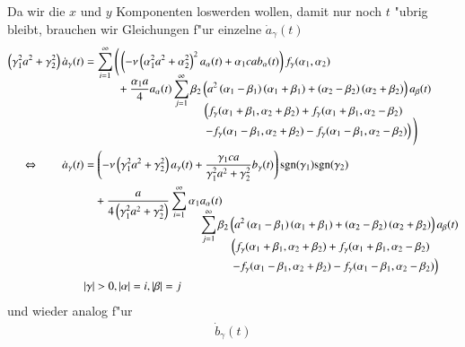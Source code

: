 \begin{refsection}
Da wir die $x$ und $y$ Komponenten loswerden wollen, damit nur noch $t$ "ubrig 
bleibt, brauchen wir Gleichungen f"ur einzelne $\dot{a}_\gamma(t)$
\begin{align}
\left(\gamma_1^2 a^2 + \gamma_2^2\right)
\dot{a}_\gamma(t)
&=
\sum_{i = 1}^{\infty}
\Bigg(
\left(
-\nu
\left(\alpha_1^2 a^2+\alpha_2^2\right)^2
a_{\alpha}(t)
+
\alpha_1 c a
b_{\alpha}(t)
\right)
f_\gamma(\alpha_1, \alpha_2) \nonumber
\\[-2ex]
&\phantom{=aaaa{}}
+
\frac{\alpha_1 a}{4}
a_{\alpha}(t)
\sum_{j = 1}^{\infty}
\beta_2
\left(
a^2 \left(\alpha_1 - \beta_1 \right)\left(\alpha_1 + \beta_1 \right)
+ \left(\alpha_2 - \beta_2 \right)\left(\alpha_2 + \beta_2 \right)
\right)
a_{\beta}(t) \nonumber
\\[-2ex]
&\phantom{=-4aapaata..\sum\sum.....{}}
\left(
f_\gamma(\alpha_1 + \beta_1, \alpha_2 + \beta_2)
+
f_\gamma(\alpha_1 + \beta_1, \alpha_2 - \beta_2)
\right. \nonumber
\\[-1.5ex]
&\phantom{=-4aapaata..\sum\sum.....{}}
\left.
-
f_\gamma(\alpha_1 - \beta_1, \alpha_2 + \beta_2)
-
f_\gamma(\alpha_1 - \beta_1, \alpha_2 - \beta_2)
\right)
\Bigg) \nonumber
\\
\Leftrightarrow \qquad
\dot{a}_\gamma(t)
&=
\left(
-\nu
\left(\gamma_1^2 a^2+\gamma_2^2\right)
a_{\gamma}(t)
+
\frac{\gamma_1 ca}{\gamma_1^2 a^2 + \gamma_2^2}
b_{\gamma}(t)
\right)
\sgn(\gamma_1)\sgn(\gamma_2) \nonumber
\\
&\phantom{={}}
+
\frac{a}{4 \left(\gamma_1^2 a^2 + \gamma_2^2\right)}
\sum_{i = 1}^{\infty}
\alpha_1
a_{\alpha}(t) \nonumber
\\[-3ex]
&\phantom{=a.-4aapaata...a\sum..{}}
\sum_{j = 1}^{\infty}
\beta_2
\left(
a^2 \left(\alpha_1 - \beta_1 \right)\left(\alpha_1 + \beta_1 \right)
+ \left(\alpha_2 - \beta_2 \right)\left(\alpha_2 + \beta_2 \right)
\right)
a_{\beta}(t) \nonumber
\\[-2ex]
&\phantom{=a.-4aapaata...a\sum....\sum..{}}
\left(
f_\gamma(\alpha_1 + \beta_1, \alpha_2 + \beta_2)
+
f_\gamma(\alpha_1 + \beta_1, \alpha_2 - \beta_2)
\right. \nonumber
\\[-.5ex]
&\phantom{=a.-4aapaata...a\sum....\sum..{}}
\left.
-
f_\gamma(\alpha_1 - \beta_1, \alpha_2 + \beta_2)
-
f_\gamma(\alpha_1 - \beta_1, \alpha_2 - \beta_2)
\right)
\label{equation:lorenz2:dota}
\\
&|\gamma| > 0, |\alpha| = i, |\beta| = j \nonumber
\end{align}
und wieder analog f"ur
\begin{align}
\dot{b}_\gamma(t)

\end{align}
\end{refsection}
